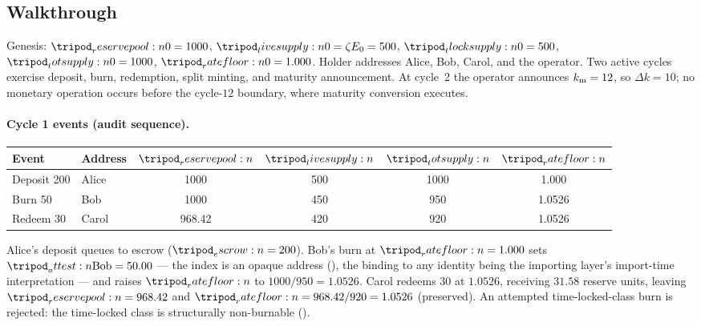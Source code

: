 \documentclass[../main.tex]{subfiles}
\begin{document}
\subsection{Walkthrough}
\label{sec:verification:walkthrough}

Genesis: $\reservepool{0} = 1000$, $\livesupply{0} = \livesplit\genesisreserve = 500$,
$\tlocksupply{0} = 500$, $\totsupply{0} = 1000$, $\ratefloor{0} = 1.000$. Holder addresses
Alice, Bob, Carol, and the operator. Two active cycles exercise deposit, burn, redemption,
split minting, and maturity announcement. At cycle~2 the operator announces $k\sb{\mathrm{m}}=12$,
so $\Delta k=10$; no monetary operation occurs before the cycle-$12$ boundary, where
maturity conversion executes.

\paragraph{Cycle 1 events (audit sequence).}
\label{verif:walkthrough:cycle-one}
\begin{center}
\begin{tabular}{@{}l l c c c c@{}}
    \toprule
    \textbf{Event} & \textbf{Address}
        & $\reservepool{}$ & $\livesupply{}$ & $\totsupply{}$ & $\ratefloor{}$ \\
    \midrule
    Deposit 200 & Alice & 1000   & 500 & 1000 & 1.000 \\
    Burn 50     & Bob   & 1000   & 450 & 950  & 1.0526 \\
    Redeem 30   & Carol & 968.42 & 420 & 920  & 1.0526 \\
    \bottomrule
\end{tabular}
\end{center}
Alice's deposit queues to escrow ($\escrow{} = 200$). Bob's burn at $\ratefloor{} = 1.000$
sets $\attest{\mathrm{Bob}} = 50.00$ --- the index is an opaque address
(), the binding to any identity being the importing
layer's import-time interpretation --- and raises $\ratefloor{}$ to $1000/950 = 1.0526$.
Carol redeems 30 at $1.0526$, receiving $31.58$ reserve units, leaving $\reservepool{} =
968.42$ and $\ratefloor{} = 968.42/920 = 1.0526$ (preserved). An attempted time-locked-class
burn is rejected: the time-locked class is structurally non-burnable
().
\end{document}
